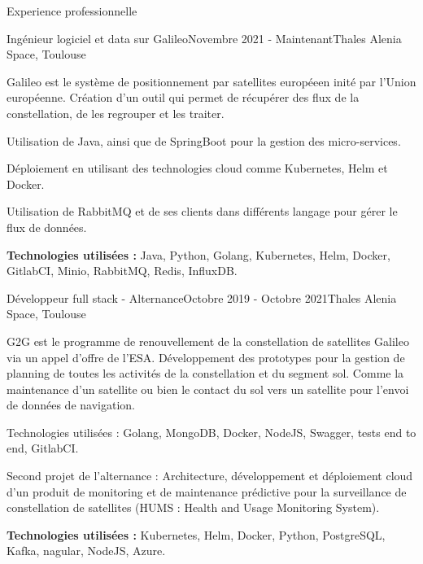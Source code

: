 \documentclass[
	11pt, %
]{resume} %
\begin{document}

\begin{rSection}{Experience professionnelle}

	\begin{rSubsection}{Ingénieur logiciel et data sur Galileo}{Novembre 2021 - Maintenant}{Thales Alenia Space, Toulouse}{}
 		\item Galileo est le système de positionnement par satellites européeen inité par l'Union européenne. 
			Création d'un outil qui permet de récupérer des flux de la constellation, de les regrouper et les traiter.
 		\item Utilisation de Java, ainsi que de SpringBoot pour la gestion des micro-services.
 		\item Déploiement en utilisant des technologies cloud comme Kubernetes, Helm et Docker.
 		\item Utilisation de RabbitMQ et de ses clients dans différents langage pour gérer le flux de données.
		\item \textbf{Technologies utilisées : }Java, Python, Golang, Kubernetes, Helm, Docker, GitlabCI, Minio, RabbitMQ, Redis, InfluxDB.
	\end{rSubsection}

	\begin{rSubsection}{Développeur full stack - Alternance}{Octobre 2019 - Octobre 2021}{Thales Alenia Space, Toulouse}{}
 		\item G2G est le programme de renouvellement de la constellation de satellites Galileo via un appel d'offre de l'ESA. 
			Développement des prototypes pour la gestion de planning de toutes les activités de la constellation et du segment sol. 
			Comme la maintenance d'un satellite ou bien le contact du sol vers un satellite pour l'envoi de données de navigation.
 		\item Technologies utilisées : Golang, MongoDB, Docker, NodeJS, Swagger, tests end to end, GitlabCI.
 		\item Second projet de l'alternance : Architecture, développement et déploiement cloud d'un produit de monitoring et de maintenance prédictive 
			pour la surveillance de constellation de satellites (HUMS : Health and Usage Monitoring System).
		\item \textbf{Technologies utilisées :} Kubernetes, Helm, Docker, Python, PostgreSQL, Kafka, nagular, NodeJS, Azure.
	\end{rSubsection}


\end{rSection}
\end{document}
